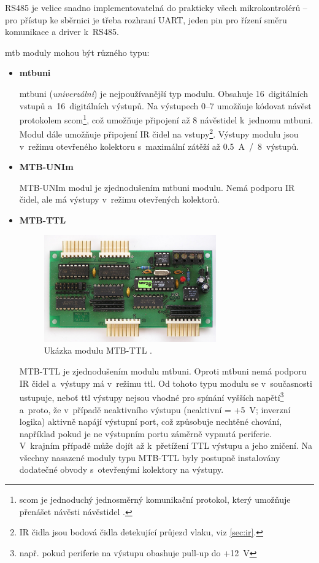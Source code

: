 RS485 je velice snadno implementovatelná do prakticky všech mikrokontrolérů –
pro přístup ke sběrnici je třeba rozhraní UART, jeden pin pro řízení směru
komunikace a driver k~RS485.

\gls{mtb} moduly mohou být různého typu:

\begin{itemize}
\item \textbf{\gls{mtbuni}}

	\gls{mtbuni} (\textit{univerzální}) je nejpoužívanější typ modulu. Obsahuje
	16~digitálních vstupů a~16~digitálních výstupů. Na výstupech 0–7 umožňuje
	kódovat návěst protokolem \gls{scom}\footnote{\gls{scom} je jednoduchý jednosměrný
	komunikační protokol, který umožňuje přenášet návěsti návěstidel
	\cite{scom-specs}.}, což umožňuje připojení až 8 návěstidel k~jednomu
	\gls{mtbuni}. Modul dále umožňuje připojení IR čidel na
	vstupy\footnote{IR čidla jsou bodová čidla detekující průjezd vlaku, viz
	\ref{sec:ir}.}. Výstupy modulu jsou v~režimu otevřeného kolektoru
	s~maximální zátěží až 0.5~A~/~8~výstupů.

\item \textbf{MTB-UNIm}

	MTB-UNIm modul je zjednodušením \gls{mtbuni} modulu. Nemá podporu IR čidel,
	ale má výstupy v~režimu otevřených kolektorů.

\item \textbf{MTB-TTL}

	\begin{figure}[ht]
	\includegraphics[width=0.7\textwidth]{data/mtbttl_foto.jpg}
	\caption{Ukázka modulu MTB-TTL \cite{mtb:web}.}
	\label{fig:mtbttl}
	\end{figure}

	MTB-TTL je zjednodušením modulu \gls{mtbuni}. Oproti \gls{mtbuni}
	nemá podporu IR čidel a~výstupy má v~režimu \gls{ttl}. Od tohoto typu
	modulu se v~současnosti ustupuje, neboť \gls{ttl} výstupy nejsou vhodné pro
	spínání vyšších napětí\footnote{např. pokud periferie na výstupu obashuje
	pull-up do +12~V} a~proto, že v~případě neaktivního výstupu (neaktivní =
	+5~V; inverzní logika) aktivně napájí výstupní port, což způsobuje nechtěné
	chování, například pokud je ne výstupním portu záměrně vypnutá periferie.
	V~krajním případě může dojít až k~přetížení TTL výstupu a jeho zničení. Na
	všechny nasazené moduly typu MTB-TTL byly postupně instalovány dodatečné
	obvody s~otevřenými kolektory na výstupy.


\end{itemize}

